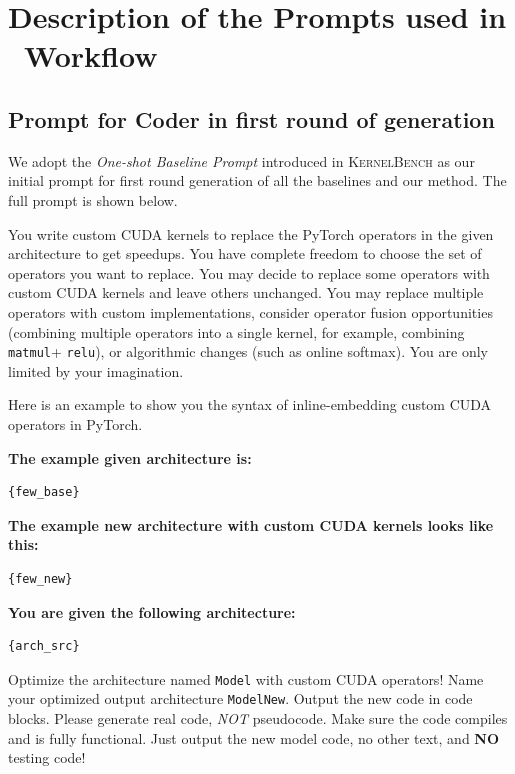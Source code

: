 \appendix
\section{Description of the Prompts used in \agentname~Workflow}\label{app:prompt}
\subsection{Prompt for Coder in first round of generation} %
We adopt the \emph{One-shot Baseline Prompt} introduced in \textsc{KernelBench} as our initial prompt for first round generation of all the baselines and our method. The full prompt is shown below.

\begin{tcolorbox}[mybox, title={Prompt for Coder in first round of generation}]
You write custom CUDA kernels to replace the PyTorch operators in the given architecture to get speedups.
You have complete freedom to choose the set of operators you want to replace. You may decide to replace
some operators with custom CUDA kernels and leave others unchanged. You may replace multiple operators
with custom implementations, consider operator fusion opportunities (combining multiple operators into a
single kernel, for example, combining \texttt{matmul}+ \texttt{relu}), or algorithmic changes (such as online softmax).
You are only limited by your imagination.

Here is an example to show you the syntax of inline-embedding custom CUDA operators in PyTorch.

\textbf{The example given architecture is:}
\begin{lstlisting}[style=nice, language=Python]
{few_base}
\end{lstlisting}

\textbf{The example new architecture with custom CUDA kernels looks like this:}
\begin{lstlisting}[style=nice, language=Python]
{few_new}
\end{lstlisting}

\textbf{You are given the following architecture:}
\begin{lstlisting}[style=nice, language=Python]
{arch_src}
\end{lstlisting}

Optimize the architecture named \texttt{Model} with custom CUDA operators! Name your optimized output
architecture \texttt{ModelNew}. Output the new code in code blocks. Please generate real code, \emph{NOT}
pseudocode. Make sure the code compiles and is fully functional. Just output the new model code, no other
text, and \textbf{NO} testing code!
\end{tcolorbox}
\lstset{language=python}

